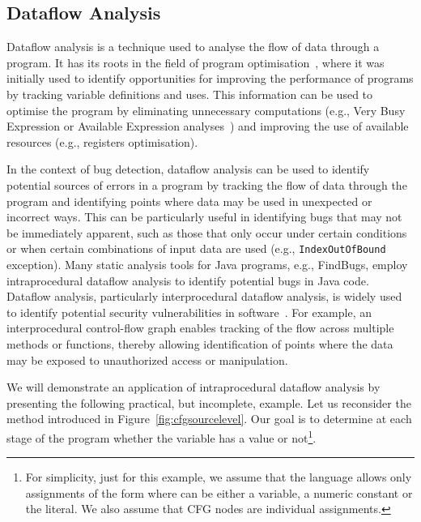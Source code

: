 \subsection{Dataflow Analysis}%
\label{sec:dataflowanalysis}
Dataflow analysis is a technique used to analyse the flow of
data through a program. It has its roots in the field of program optimisation~\cite{kildall1973dataflow},
where it was initially used to identify opportunities for improving the performance
of programs by tracking variable definitions and uses. This information can be used to optimise the program by eliminating
unnecessary computations (e.g., Very Busy Expression or Available Expression
analyses~\cite{aho2007compilers}) and improving
the use of available resources (e.g., registers optimisation).


In the context of bug detection, dataflow analysis can be used to identify
potential sources of errors in a program by tracking the flow of data through
the program and identifying points where data may be used in unexpected or
incorrect ways. This can be particularly useful in identifying bugs that may
not be immediately apparent, such as those that only occur under certain
conditions or when certain combinations of input data are used (e.g., \texttt{IndexOutOfBound} exception).
Many static analysis tools for Java programs, e.g., FindBugs, employ intraprocedural
dataflow analysis to identify potential bugs in Java code.
Dataflow analysis, particularly interprocedural dataflow analysis, is widely
used to identify potential security vulnerabilities in software~\cite{flowDroid}.
For example, an interprocedural control-flow graph enables tracking of the flow
across multiple methods or functions, thereby allowing identification of points
where the data may be exposed to unauthorized access or manipulation.

We will demonstrate an application of intraprocedural dataflow analysis by presenting the following
practical, but incomplete, example. Let us reconsider the  method introduced in Figure~\ref{fig:cfgsourcelevel}.
Our goal is to determine at each stage of the program whether the variable 
has a  value or not\footnote{For simplicity, just for this example, we assume that the language
allows only assignments of the form  where  can
be either a  variable, a numeric constant or the  literal. We also assume
that CFG nodes are individual assignments.
}.

